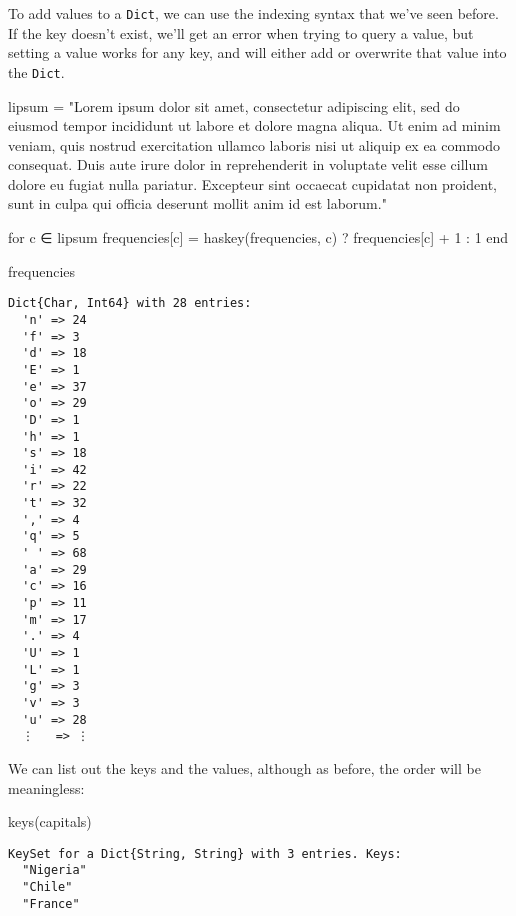 \documentclass[
  letterpaper,
  DIV=11,
  numbers=noendperiod]{scrreprt}
\newenvironment{Shaded}{\begin{snugshade}}{\end{snugshade}}
\newcommand{\ControlFlowTok}[1]{\textcolor[rgb]{0.00,0.23,0.31}{#1}}
\newcommand{\FloatTok}[1]{\textcolor[rgb]{0.68,0.00,0.00}{#1}}
\newcommand{\FunctionTok}[1]{\textcolor[rgb]{0.28,0.35,0.67}{#1}}
\newcommand{\NormalTok}[1]{\textcolor[rgb]{0.00,0.23,0.31}{#1}}
\newcommand{\OperatorTok}[1]{\textcolor[rgb]{0.37,0.37,0.37}{#1}}
\newcommand{\StringTok}[1]{\textcolor[rgb]{0.13,0.47,0.30}{#1}}
\begin{document}
To add values to a \texttt{Dict}, we can use the indexing syntax that
we've seen before. If the key doesn't exist, we'll get an error when
trying to query a value, but setting a value works for any key, and will
either add or overwrite that value into the \texttt{Dict}.

\begin{Shaded}
\begin{Highlighting}[]
\NormalTok{lipsum }\OperatorTok{=} \StringTok{"Lorem ipsum dolor sit amet, consectetur adipiscing elit, sed do eiusmod tempor incididunt ut labore et dolore magna aliqua. Ut enim ad minim veniam, quis nostrud exercitation ullamco laboris nisi ut aliquip ex ea commodo consequat. Duis aute irure dolor in reprehenderit in voluptate velit esse cillum dolore eu fugiat nulla pariatur. Excepteur sint occaecat cupidatat non proident, sunt in culpa qui officia deserunt mollit anim id est laborum."}

\ControlFlowTok{for}\NormalTok{ c }\OperatorTok{∈}\NormalTok{ lipsum}
\NormalTok{    frequencies[c] }\OperatorTok{=} \FunctionTok{haskey}\NormalTok{(frequencies, c) ? frequencies[c] }\OperatorTok{+} \FloatTok{1} \OperatorTok{:} \FloatTok{1}
\ControlFlowTok{end}

\NormalTok{frequencies}
\end{Highlighting}
\end{Shaded}

\begin{verbatim}
Dict{Char, Int64} with 28 entries:
  'n' => 24
  'f' => 3
  'd' => 18
  'E' => 1
  'e' => 37
  'o' => 29
  'D' => 1
  'h' => 1
  's' => 18
  'i' => 42
  'r' => 22
  't' => 32
  ',' => 4
  'q' => 5
  ' ' => 68
  'a' => 29
  'c' => 16
  'p' => 11
  'm' => 17
  '.' => 4
  'U' => 1
  'L' => 1
  'g' => 3
  'v' => 3
  'u' => 28
  ⋮   => ⋮
\end{verbatim}

We can list out the keys and the values, although as before, the order
will be meaningless:

\begin{Shaded}
\begin{Highlighting}[]
\FunctionTok{keys}\NormalTok{(capitals)}
\end{Highlighting}
\end{Shaded}

\begin{verbatim}
KeySet for a Dict{String, String} with 3 entries. Keys:
  "Nigeria"
  "Chile"
  "France"
\end{verbatim}
\end{document}
